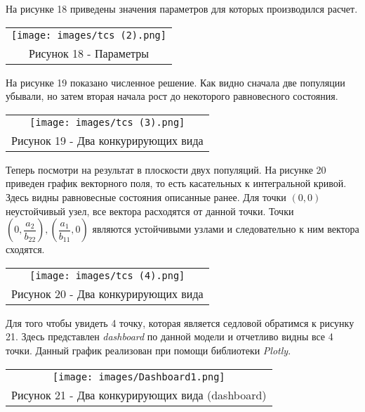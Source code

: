 На рисунке 18 приведены значения параметров для которых производился расчет.
\begin{center}
  \begin{tabular}{c}
    \texttt{[image: images/tcs (2).png]}\\
    Рисунок 18 - Параметры
  \end{tabular}
\end{center}
На рисунке 19 показано численное решение. Как видно сначала две популяции убывали, но затем вторая начала рост до некоторого равновесного состояния.
\begin{center}
  \begin{tabular}{c}
    \texttt{[image: images/tcs (3).png]}\\
    Рисунок 19 - Два конкурирующих вида
  \end{tabular}
\end{center}
Теперь посмотри на результат в плоскости двух популяций. На рисунке 20 приведен график векторного поля, то есть касательных к интегральной кривой. Здесь видны равновесные состояния описанные ранее. Для точки $(0,0)$ неустойчивый узел, все вектора расходятся от данной точки. Точки $(0,\dfrac{a_2}{b_{22}}),(\dfrac{a_1}{b_{11}},0)$ являются устойчивыми узлами и следовательно к ним вектора сходятся.
\begin{center}
  \begin{tabular}{c}
    \texttt{[image: images/tcs (4).png]}\\
    Рисунок 20 - Два конкурирующих вида
  \end{tabular}
\end{center}
Для того чтобы увидеть 4 точку, которая является седловой обратимся к рисунку 21. Здесь представлен \textit{dashboard} по данной модели и отчетливо видны все 4 точки. Данный график реализован при помощи библиотеки \textit{Plotly}.
\begin{center}
  \begin{tabular}{c}
    \texttt{[image: images/Dashboard1.png]}\\
    Рисунок 21 - Два конкурирующих вида (dashboard)
  \end{tabular}
\end{center}

